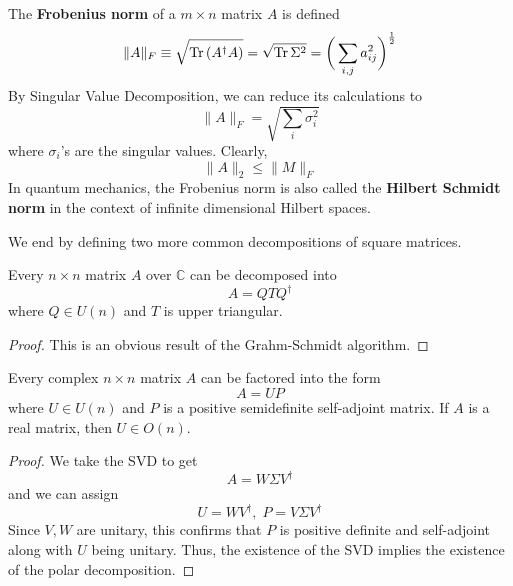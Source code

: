   \begin{definition}
    The \textbf{Frobenius norm} of a $m \times n$ matrix $A$ is defined
    \begin{equation}
      \|A\|_F \equiv \sqrt{\operatorname{Tr}{(A^\dagger A)}} = \sqrt{\operatorname{Tr}{\Sigma^2}} = \bigg( \sum_{i, j} a_{i j}^2 \bigg)^{\frac{1}{2}} 
    \end{equation}
    By Singular Value Decomposition, we can reduce its calculations to
    \begin{equation}
      \|A\|_F = \sqrt{\sum_i \sigma_i^2}
    \end{equation}
    where $\sigma_i$'s are the singular values. Clearly, 
    \begin{equation}
      \|A\|_2 \leq \|M\|_F
    \end{equation}
    In quantum mechanics, the Frobenius norm is also called the \textbf{Hilbert Schmidt norm} in the context of infinite dimensional Hilbert spaces. 
  \end{definition}

  We end by defining two more common decompositions of square matrices. 

  \begin{theorem}
    Every $n \times n$ matrix $A$ over $\mathbb{C}$ can be decomposed into
    \begin{equation}
      A = Q T Q^\dagger
    \end{equation}
    where $Q \in U(n)$ and $T$ is upper triangular. 
  \end{theorem}
  \begin{proof}
    This is an obvious result of the Grahm-Schmidt algorithm. 
  \end{proof}

  \begin{theorem}
    Every complex $n \times n$ matrix $A$ can be factored into the form
    \begin{equation}
      A = U P
    \end{equation}
    where $U \in U(n)$ and $P$ is a positive semidefinite self-adjoint matrix. If $A$ is a real matrix, then $U \in O(n)$. 
  \end{theorem}
  \begin{proof}
    We take the SVD to get 
    \begin{equation}
      A = W \Sigma V^\dagger
    \end{equation}
    and we can assign 
    \begin{equation}
      U = W V^\dagger, \; P = V \Sigma V^\dagger
    \end{equation}
    Since $V, W$ are unitary, this confirms that $P$ is positive definite and self-adjoint along with $U$ being unitary. Thus, the existence of the SVD implies the existence of the polar decomposition. 
  \end{proof}

